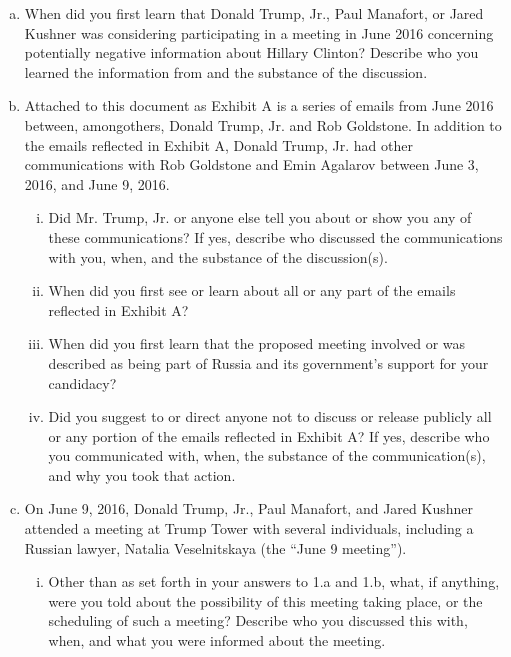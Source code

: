 \begin{enumerate}[a.]

\item When did you first learn that Donald Trump, Jr., Paul Manafort, or Jared Kushner was considering participating in a meeting in June 2016 concerning potentially negative information about Hillary Clinton?
Describe who you learned the information from and the substance of the discussion.

\item Attached to this document as Exhibit A is a series of emails from June 2016 between, amongothers, Donald Trump, Jr. and Rob Goldstone.
In addition to the emails reflected in Exhibit A, Donald Trump, Jr. had other communications with Rob Goldstone and Emin Agalarov between June 3, 2016, and June 9, 2016.

\begin{enumerate}[i.]

\item Did Mr. Trump, Jr. or anyone else tell you about or show you any of these communications?
If yes, describe who discussed the communications with you, when, and the substance of the discussion(s).

\item When did you first see or learn about all or any part of the emails reflected in Exhibit A?

\item When did you first learn that the proposed meeting involved or was described as being part of Russia and its government’s support for your candidacy?

\item Did you suggest to or direct anyone not to discuss or release publicly all or any portion of the emails reflected in Exhibit A? If yes, describe who you communicated with, when, the substance of the communication(s), and why you took that action.

\end{enumerate}

\item On June 9, 2016, Donald Trump, Jr., Paul Manafort, and Jared Kushner attended a meeting at Trump Tower with several individuals, including a Russian lawyer, Natalia Veselnitskaya (the “June 9 meeting”).

\begin{enumerate}[i.]

\item Other than as set forth in your answers to 1.a and 1.b, what, if anything, were you told about the possibility of this meeting taking place, or the scheduling of such a meeting?
Describe who you discussed this with, when, and what you were informed about the meeting.


\end{enumerate}
\end{enumerate}
